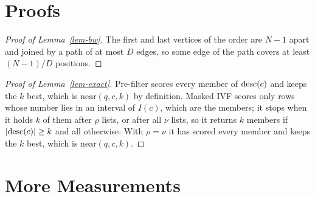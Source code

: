 \section{Proofs}
\label{apx-proofs}

\begin{proof}[Proof of Lemma~\ref{lem-bw}]
The first and last vertices of the order are $N-1$ apart and joined by a path of at most
$D$ edges, so some edge of the path covers at least $(N-1)/D$ positions.
\end{proof}

\begin{proof}[Proof of Lemma~\ref{lem-exact}]
Pre-filter scores every member of $\mathrm{desc}(c)$ and keeps the $k$ best, which is
$\mathrm{near}(q,c,k)$ by definition.
Masked IVF scores only rows whose number lies in an interval of $I(c)$, which are the
members; it stops when it holds $k$ of them after $\rho$ lists, or after all $\nu$ lists,
so it returns $k$ members if $|\mathrm{desc}(c)|\ge k$ and all otherwise.
With $\rho=\nu$ it has scored every member and keeps the $k$ best, which is
$\mathrm{near}(q,c,k)$.
\end{proof}

\section{More Measurements}
\label{apx-more}




